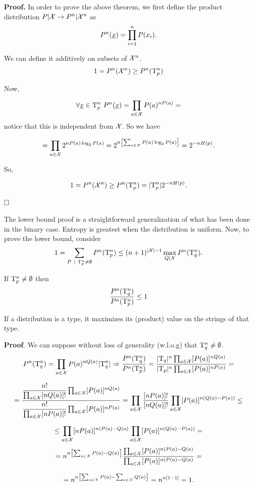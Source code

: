 \noindent\textbf{Proof.} In order to prove the above theorem, we first define the product distribution $P|\mathcal{X} \rightarrow P^n|\mathcal{X}^n$ as 
\begin{equation}
	P^n(\underline{x}) = \prod_{i = 1}^nP(x_i).
\end{equation}

We can define it additively on subsets of $\mathcal{X}^n$.
\[
1 = P^n(\mathcal{X}^n) \geq P^n(\mathrm{T}_p^n)
\]

Now,

\[
\forall \str{x} \in \Tau_p^n\ P^n(\str{x}) = \prod_{a \in \xset}P(a)^{nP(a)} =
\]
notice that this is independent from $\mathcal{X}$. So we have

\[ 
= \prod_{a \in \mathcal{X}} 2^{nP(a)\log_2P(a)} = 2^{n\left[\sum_{a \in \mathcal{X}} P(a)\log_2P(a)\right]} = 2^{-nH(p)}.
\]

So,

\[1 = P^n(\mathcal{X}^n) \geq P^n(\mathrm{T}^n_p) = |\mathrm{T}_p^n|2^{-nH(p)}. \]

$\hfill\Box$

The lower bound proof is a straightforward generalization of what has been done in the binary case. Entropy is greatest when the distribution is uniform. Now, to prove the lower bound, consider
\[
1 = \sum_{P\ |\ \mathrm{T}_p^n \not= \emptyset}P^n(\mathrm{T}_p^n) \leq (n+1)^{|\mathcal{X}|-1} \max_{Q|\mathcal{X}}P^n(\mathrm{T}_q^n).
\]

\begin{obs}
If $\mathrm{T}^n_p \not= \emptyset$ then $$\dfrac{P^n(\mathrm{T}^n_q)}{P^n(\mathrm{T}^n_p)} \leq 1$$

If a distribution is a type, it maximizes its (product) value on the strings of that type. 
\end{obs}

\noindent\textbf{Proof}. We can suppose without loss of generality (w.l.o.g) that $\mathrm{T}^n_q \not= \emptyset$.
\[
P^n(\mathrm{T}_q^n) = \prod_{a \in \mathcal{X}} P(a)^{nQ(a)}|\mathrm{T}_q^n| \Rightarrow \dfrac{P^n(\mathrm{T}_q^n)}{P^n(\mathrm{T}_p^n)} = \dfrac{|\mathrm{T}_q|^n\prod_{a \in \mathcal{X}}[P(a)]^{nQ(a)}}{|\mathrm{T}_p|^n\prod_{a \in \mathcal{X}}[P(a)]^{nP(a)}} =
\]

\[
 = \dfrac{\dfrac{n!}{\prod_{a\in\mathcal{X}}[nQ(a)]!}\prod_{a\in\mathcal{X}}[P(a)]^{nQ(a)}}
 {\dfrac{n!}{\prod_{a\in\mathcal{X}}[nP(a)]!}\prod_{a\in\mathcal{X}}[P(a)]^{nP(a)}} = \prod_{a \in\mathcal{X}} \dfrac{[nP(a)]!}{[nQ(a)]!}\prod_{a\in\mathcal{X}}[P(a)]^{n(Q(a)-P(a))}\leq 
\]

\[
\leq \prod_{a \in \mathcal{X}} [nP(a)]^{n(P(a)-Q(a)}\prod_{a\in\mathcal{X}}[P(a)]^{n(Q(a)-P(a))} =
\]
\[
 = n^{n\left[\sum_{a \in \mathcal{X}}P(a) - Q(a)\right ]} \dfrac{\prod_{a \in \mathcal{X}}[P(a)]^{n(P(a)-Q(a)}}{\prod_{a \in \mathcal{X}}[P(a)]^{n(P(a)-Q(a)}} =
\]

\[ 
= n^{n\left [\sum_{a \in\mathcal{X}}P(a) -\sum_{a \in\mathcal{X}}Q(a) \right]} = n^{n[1-1]} = 1.
\]

